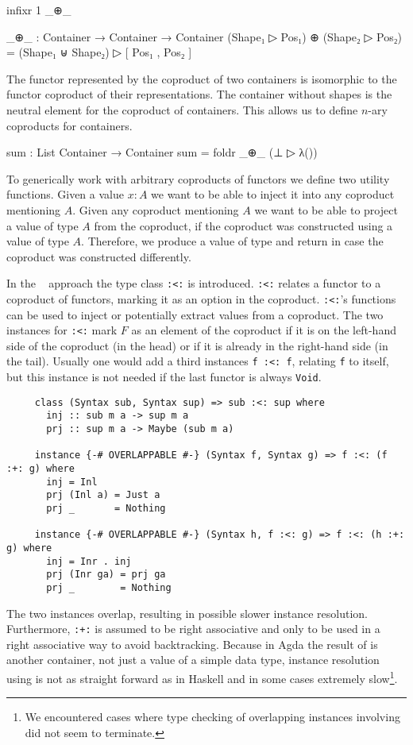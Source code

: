 \begin{code}[hide]
infixr 1 _⊕_
\end{code}
\begin{code}
_⊕_ : Container → Container → Container
(Shape₁ ▷ Pos₁) ⊕ (Shape₂ ▷ Pos₂) = (Shape₁ ⊎ Shape₂) ▷ [ Pos₁ , Pos₂ ]
\end{code}
The functor represented by the coproduct of two containers is isomorphic to the
functor coproduct of their representations.
The container without shapes is the neutral element for the coproduct of
containers.
This allows us to define $n$-ary coproducts for containers.

\begin{code}
sum : List Container → Container
sum = foldr _⊕_ (⊥ ▷ λ())
\end{code}
To generically work with arbitrary coproducts of functors we define two utility
functions.
Given a value $x:A$ we want to be able to inject it into any coproduct
mentioning $A$.
Given any coproduct mentioning $A$ we want to be able to project a value of
type $A$ from the coproduct, if the coproduct was constructed using a value of
type $A$.
Therefore, we produce a value of type
\AgdaSpace{} and return
 in case the coproduct was constructed
differently.

In the
~\cite{DBLP:journals/jfp/Swierstra08}
approach the type class \texttt{:<:} is introduced.
\texttt{:<:} relates a functor to a coproduct of functors, marking it as an
option in the coproduct.
\texttt{:<:}'s functions can be used to inject or potentially extract values
from a coproduct.
The two instances for \texttt{:<:} mark $F$ as an element of the coproduct if
it is on the left-hand side of the coproduct (in the head) or if it is already
in the right-hand side (in the tail).
Usually one would add a third instances \texttt{f :<: f}, relating \texttt{f} to
itself, but this instance is not needed if the last functor is always
\texttt{Void}.

\begin{verbatim}
     class (Syntax sub, Syntax sup) => sub :<: sup where
       inj :: sub m a -> sup m a
       prj :: sup m a -> Maybe (sub m a)

     instance {-# OVERLAPPABLE #-} (Syntax f, Syntax g) => f :<: (f :+: g) where
       inj = Inl
       prj (Inl a) = Just a
       prj _       = Nothing

     instance {-# OVERLAPPABLE #-} (Syntax h, f :<: g) => f :<: (h :+: g) where
       inj = Inr . inj
       prj (Inr ga) = prj ga
       prj _        = Nothing
\end{verbatim}
The two instances overlap, resulting in possible slower instance resolution.
Furthermore, \texttt{:+:} is assumed to be right associative and only to be
used in a right associative way to avoid backtracking.
Because in Agda the result of  is another container, not
just a value of a simple data type, instance resolution using
 is not as straight forward as in Haskell and in some cases
extremely slow\footnote{We encountered cases where type checking of overlapping
instances involving  did not seem to terminate.}.

